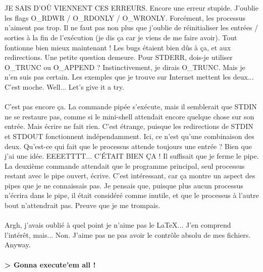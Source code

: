 \\\\
JE SAIS D'OÙ VIENNENT CES ERREURS. Encore une erreur stupide. J'oublie les flags O\_RDWR / O\_RDONLY / O\_WRONLY. Forcément, les processus n'aiment pas trop. Il ne faut pas non plus que j'oublie de réinitialiser les entrées / sorties à la fin de l'exécution (je dis ça car je viens de me faire avoir). Tout fontionne bien mieux maintenant ! Les bugs étaient bien dûs à ça, et aux redirections. Une petite question demeure. Pour STDERR, dois-je utiliser O\_TRUNC ou O\_APPEND ? Instinctivement, je dirais O\_TRUNC. Mais je n'en suis pas certain. Les exemples que je trouve sur Internet mettent les deux... C'est moche. Well... Let's give it a try.
\\\\
C'est pas encore ça. La commande pipée s'exécute, mais il semblerait que STDIN ne se restaure pas, comme si le mini-shell attendait encore quelque chose sur son entrée. Mais écrire ne fait rien. C'est étrange, puisque les redirections de STDIN et STDOUT fonctionnent indépendamment. Ici, ce n'est qu'une combinaison des deux. Qu'est-ce qui fait que le processus attende toujours une entrée ? Bien que j'ai une idée. EEEETTTT... C'ÉTAIT BIEN ÇA ! Il suffisait que je ferme le pipe. La deuxième commande attendait que le programme principal, seul processus restant avec le pipe ouvert, écrive. C'est intéressant, car ça montre un aspect des pipes que je ne connaissais pas. Je pensais que, puisque plus aucun processus n'écrira dans le pipe, il était considéré comme inutile, et que le processus à l'autre bout n'attendrait pas. Preuve que je me trompais.
\\\\
Argh, j'avais oublié à quel point je n'aime pas le \LaTeX... J'en comprend l'intérêt, mais... Non. J'aime pas ne pas avoir le contrôle absolu de mes fichiers. Anyway.
\\\\
\textbf{> Gonna execute'em all !}